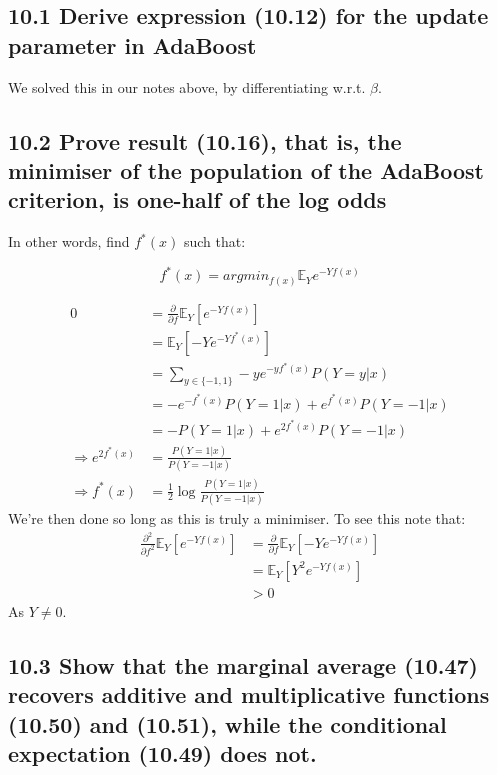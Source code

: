 \subsection*{10.1 Derive expression (10.12) for the update parameter in AdaBoost}
We solved this in our notes above, by differentiating w.r.t. $\beta$.

\subsection*{10.2 Prove result (10.16), that is, the minimiser of the population of the AdaBoost criterion, is one-half of the log odds}

In other words, find $f^*(x)$ such that:

$$ f^*(x) = argmin_{f(x)} \mathbb{E}_Y e^{-Yf(x)}$$

\begin{align*}
    0 &= \frac{\partial}{\partial f}  \mathbb{E}_Y \left[e^{-Yf(x)}\right]\\
    &=   \mathbb{E}_Y \left[-Ye^{-Yf^*(x)}\right]\\
    &=   \sum_{y \in \{-1, 1\}} -ye^{-yf^*(x)} P(Y = y \vert x) \\
    &=   -e^{-f^*(x)} P(Y = 1 \vert x) + e^{f^*(x)} P(Y = -1 \vert x) \\
    &=   -P(Y = 1 \vert x) + e^{2 f^*(x)} P(Y = -1 \vert x) \\
    \Rightarrow e^{2 f^*(x)} &= \frac{P(Y = 1 \vert x)}{P(Y = -1 \vert x) }\\
    \Rightarrow f^*(x) &= \frac{1}{2} \log \frac{P(Y = 1 \vert x)}{P(Y = -1 \vert x) }
\end{align*}
We're then done so long as this is truly a minimiser. To see this note that:
\begin{align*}
     \frac{\partial^2}{\partial f^2}  \mathbb{E}_Y \left[e^{-Yf(x)}\right] &= \frac{\partial}{\partial f} \mathbb{E}_Y \left[-Ye^{-Yf(x)}\right] \\
     &=  \mathbb{E}_Y \left[Y^2 e^{-Yf(x)}\right] \\
     &> 0
\end{align*}
As $Y \neq 0$.

\subsection{10.3 Show that the marginal average (10.47) recovers additive and multiplicative functions (10.50) and (10.51), while the conditional expectation (10.49) does not.}